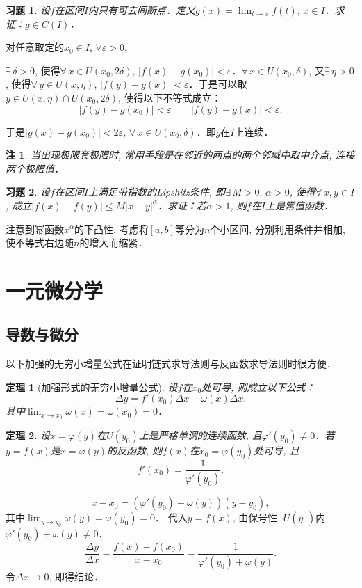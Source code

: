 \documentclass[11pt,a4paper]{ctexart}
\makeatletter
\theoremstyle{thmseries} %
\newtheorem{thm}{定理}[section]
\theoremstyle{exerseries}
\newtheorem{exer}{习题}[section]
\newtheorem*{rem}{注}
\renewenvironment{proof}[1][\proofname]{\par
  \pushQED{\qed}%
  \normalfont \topsep6\p@\@plus6\p@\relax
  \trivlist
  \item[\hskip\labelsep
        \itshape
    #1\@addpunct{}]\ignorespaces
}{%
  \popQED\endtrivlist\@endpefalse
}
\newenvironment{pf}{\begin{proof}[\bfseries\upshape 证\quad]}{\end{proof}}
\newcommand{\bra}[1]{\mathopen{}\left(#1\right)}
\renewcommand{\epsilon}{\varepsilon}
\renewcommand{\phi}{\varphi}
\makeatother
\begin{document}
\begin{exer}
	设$f$在区间$I$内只有可去间断点．定义$g(x)=\lim_{t\to x}f(t),\,x\in I$．求证：$g\in C(I)$．
\end{exer}
\begin{pf}
	对任意取定的$x_0\in I$, $\forall \epsilon>0$, 

	$\exists\,\delta>0$, 使得$\forall\, x\in U(x_0,2\delta),\,|f(x)-g(x_0)|<\epsilon$．$\forall\,x\in U(x_0,\delta)$, 又$\exists\,\eta>0$, 使得$\forall\,y\in U(x,\eta),\,|f(y)-g(x)|<\epsilon$．于是可以取$y\in U(x,\eta)\cap U(x_0,2\delta)$, 使得以下不等式成立：
	\[|f(y)-g(x_0)|<\epsilon\qquad|f(y)-g(x)|<\epsilon.\]

	于是$|g(x)-g(x_0)|<2\epsilon,\,\forall\,x\in U(x_0,\delta)$．即$g$在$I$上连续．
\end{pf}
\begin{rem}
	当出现极限套极限时, 常用手段是在邻近的两点的两个邻域中取中介点, 连接两个极限值．
\end{rem}

\begin{exer}
	设$f$在区间$I$上满足带指数的Lipshitz条件, 即$\exists\,M>0,\,\alpha>0$, 使得$\forall\,x,y\in I$, 成立$|f(x)-f(y)|\leq M|x-y|^\alpha$．求证：若$\alpha>1$, 则$f$在$I$上是常值函数．
\end{exer}
\begin{pf}
	注意到幂函数$x^\alpha$的下凸性, 考虑将$[a,b]$等分为$n$个小区间, 分别利用条件并相加, 使不等式右边随$n$的增大而缩紧．
\end{pf}


\section{一元微分学}
\subsection{导数与微分}
以下加强的无穷小增量公式在证明链式求导法则与反函数求导法则时很方便．
\begin{thm}[加强形式的无穷小增量公式]
	设$f$在$x_0$处可导, 则成立以下公式：
	\[\Delta y=f'(x_0)\Delta x+\omega(x)\Delta x.\]
	其中$\lim_{x\to x_0}\omega(x)=\omega(x_0)=0$．
\end{thm}

\begin{thm}
	设$x=\phi(y)$在$U(y_0)$上是严格单调的连续函数, 且$\phi'(y_0)\neq0$．若$y=f(x)$是$x=\phi(y)$的反函数, 则$f(x)$在$x_0=\phi(y_0)$处可导, 且
	\[f'(x_0)=\frac{1}{\phi'(y_0)}.\]
\end{thm}
\begin{pf}
	\[x-x_0=\bra{\phi'(y_0)+\omega(y)}(y-y_0),\]
	其中$\lim_{y\to y_0}\omega(y)=\omega(y_0)=0$．
	代入$y=f(x)$, 由保号性, $U(y_0)$内$\phi'(y_0)+\omega(y)\neq0$．
	\[\frac{\Delta y}{\Delta x}=\frac{f(x)-f(x_0)}{x-x_0}=\frac{1}{\phi'(y_0)+\omega(y)}.\]
	令$\Delta x\to0$, 即得结论．
\end{pf}
\end{document}
